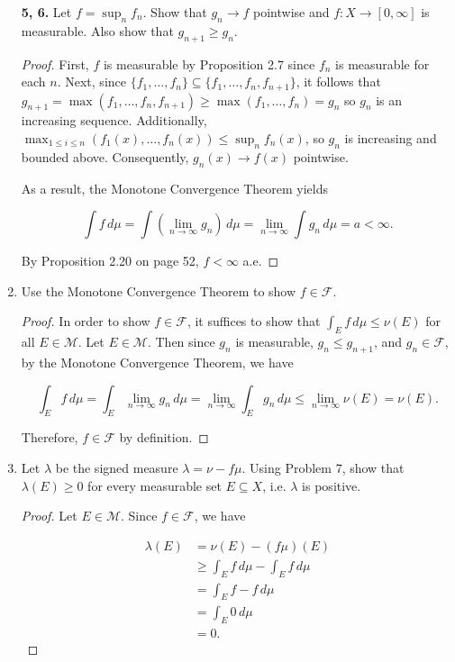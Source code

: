 \documentclass[11pt,oneside,english]{amsart}
\theoremstyle{definition}
\newcommand{\lom}[2]{\lim_{{#1}\rightarrow{#2}}}
\newcommand{\MC}[1]{\mathcal{#1}}
\begin{document}
\begin{enumerate}
\item[\textbf{5, 6.}] Let $f=\sup_n f_n$. Show that $g_n\rightarrow f$ pointwise and $f:X\rightarrow [0,\infty]$ is measurable. Also show that $g_{n+1}\geq g_n$.

\begin{proof}
First, $f$ is measurable by Proposition 2.7 since $f_n$ is measurable for each $n$. Next, since $\{f_1,\ldots,f_n\}\subseteq\{f_1,\ldots,f_n,f_{n+1}\}$, it follows that $g_{n+1}=\max(f_1,\ldots,f_n,f_{n+1})\geq \max(f_1,\ldots,f_n)=g_n$ so $g_n $ is an increasing sequence. Additionally, $\max_{1\leq i\leq n}(f_1(x),\ldots,f_n(x))\leq \sup_nf_n(x)$, so $g_n$ is increasing and bounded above. Consequently, $g_n(x)\rightarrow f(x)$ pointwise. 

As a result, the Monotone Convergence Theorem yields

\[
\int f\,d\mu=\int\left(\lom{n}{\infty} g_n\right)\,d\mu=\lom{n}{\infty}\int g_n\,d\mu=a<\infty.
\]

By Proposition 2.20 on page 52, $f<\infty$ a.e.

\end{proof}

\setcounter{enumi}{6}
\item Use the Monotone Convergence Theorem to show $f\in\MC{F}$.

\begin{proof}
In order to show $f\in\MC{F}$, it suffices to show that $\int_Ef\,d\mu\leq\nu(E)$ for all $E\in\MC{M}$. Let $E\in\MC{M}$. Then since $g_n$ is measurable, $g_n\leq g_{n+1}$, and $g_n\in\MC{F}$, by the Monotone Convergence Theorem, we have

\[
\int_Ef\,d\mu=\int_E\lom{n}{\infty}g_n\,d\mu=\lom{n}{\infty}\int_Eg_n\,d\mu\leq\lom{n}{\infty}\nu(E)=\nu(E).
\]

Therefore, $f\in\MC{F}$ by definition.
\end{proof}


\item Let $\lambda$ be the signed measure $\lambda=\nu-f\mu$. Using Problem 7, show that $\lambda(E)\geq0$ for every measurable set $E\subseteq X$, i.e. $\lambda$ is positive.

\begin{proof}
Let $E\in\MC{M}$. Since $f\in\MC{F}$, we have

\vspace{-5mm}
\begin{align*}
\lambda(E)&=\nu(E)-(f\mu)(E)\\[2mm]
&\geq\int_Ef\,d\mu-\int_Ef\,d\mu\\[2mm]
&=\int_Ef-f\,d\mu\\[2mm]
&=\int_E0\,d\mu\\[2mm]
&=0.
\end{align*}
\end{proof}


\end{enumerate}
\end{document}

